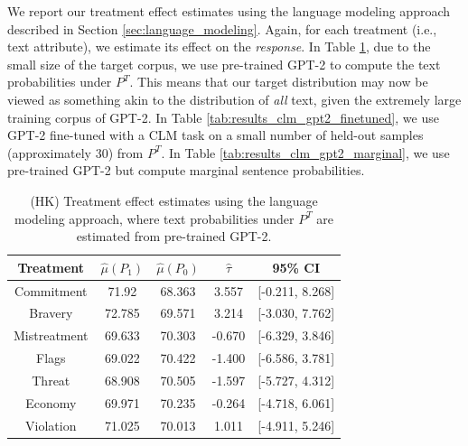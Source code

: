 \documentclass{article}
\begin{document}
We report our treatment effect estimates using the language modeling approach described in Section \ref{sec:language_modeling}. Again, for each treatment (i.e., text attribute), we estimate its effect on the \textit{response}. In Table \ref{tab:results_clm_gpt2}, due to the small size of the target corpus, we use pre-trained GPT-2 \cite{radford2019language} to compute the text probabilities under $P^T$. This means that our target distribution may now be viewed as something akin to the distribution of \textit{all} text, given the extremely large training corpus of GPT-2. In Table \ref{tab:results_clm_gpt2_finetuned}, we use GPT-2 fine-tuned with a CLM task on a small number of held-out samples (approximately 30) from $P^T$. In Table \ref{tab:results_clm_gpt2_marginal}, we use pre-trained GPT-2 but compute marginal sentence probabilities.

\begin{table}[!ht]
    \centering
    \begin{tabular}{c|cccc}
        \toprule
        Treatment & $\hat{\mu}(P_1)$ & $\hat{\mu}(P_0)$ & $\hat{\tau}$ & 95\% CI \\
        \midrule
        Commitment & 71.92 & 68.363 & \textcolor{green!50!black}{3.557} & [-0.211, 8.268] \\
        Bravery & 72.785 & 69.571 & \textcolor{green!50!black}{3.214} & [-3.030, 7.762]  \\
        Mistreatment & 69.633 & 70.303 & \textcolor{red!80!black}{-0.670} & [-6.329, 3.846]  \\
        Flags & 69.022 & 70.422 & \textcolor{red!80!black}{-1.400} & [-6.586, 3.781] \\
        Threat & 68.908 & 70.505 & \textcolor{red!80!black}{-1.597} & [-5.727, 4.312] \\
        Economy & 69.971 & 70.235 & \textcolor{red!80!black}{-0.264} & [-4.718, 6.061] \\
        Violation & 71.025 & 70.013 & \textcolor{green!50!black}{1.011} & [-4.911, 5.246] \\
        \bottomrule
    \end{tabular}
    \caption{(HK) Treatment effect estimates using the language modeling approach, where text probabilities under $P^T$ are estimated from pre-trained GPT-2.}
    \label{tab:results_clm_gpt2}
\end{table}
\end{document}
